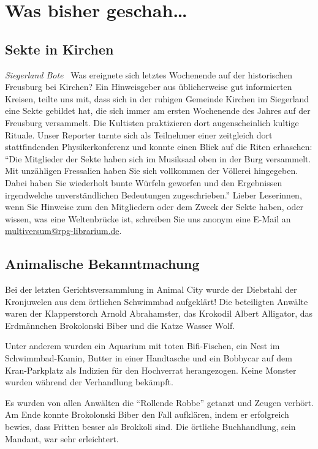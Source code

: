 \documentclass[final]{multiversum}
\begin{document}
\makemultititle
%

\section{Was bisher geschah\ldots}

\subsection{Sekte in Kirchen}
\textit{Siegerland Bote} \textendash\ Was ereignete sich letztes Wochenende auf
der historischen Freusburg bei Kirchen? Ein Hinweisgeber aus üblicherweise gut
informierten Kreisen, teilte uns mit, dass sich in der ruhigen Gemeinde Kirchen
im Siegerland eine Sekte gebildet hat, die sich immer am ersten Wochenende des
Jahres auf der Freusburg versammelt. Die Kultisten praktizieren dort
augenscheinlich kultige Rituale. Unser Reporter tarnte sich als Teilnehmer einer
zeitgleich dort stattfindenden Physikerkonferenz und konnte einen Blick auf die
Riten erhaschen: \enquote{Die Mitglieder der Sekte haben sich im Musiksaal oben
in der Burg versammelt. Mit unzähligen Fressalien haben Sie sich vollkommen der
Völlerei hingegeben. Dabei haben Sie wiederholt bunte Würfeln geworfen und den
Ergebnissen irgendwelche unverständlichen Bedeutungen zugeschrieben.} Lieber
Leserinnen, wenn Sie Hinweise zum den Mitgliedern oder dem Zweck der Sekte
haben, oder wissen, was eine Weltenbrücke ist, schreiben Sie uns anonym eine
E-Mail an \url{multiversum@rpg-librarium.de}.


\subsection{Animalische Bekanntmachung}
Bei der letzten Gerichtsversammlung in Animal City wurde der Diebstahl der
Kronjuwelen aus dem örtlichen Schwimmbad aufgeklärt!  Die beteiligten Anwälte
waren der Klapperstorch Arnold Abrahamster, das Krokodil Albert Alligator, das
Erdmännchen Brokolonski Biber und die Katze Wasser Wolf.

Unter anderem wurden
ein Aquarium mit toten Bifi-Fischen, ein Nest im Schwimmbad-Kamin, Butter in
einer Handtasche und ein Bobbycar auf dem Kran-Parkplatz als Indizien für den
Hochverrat herangezogen.  Keine Monster wurden während der Verhandlung bekämpft.

Es wurden von allen Anwälten die \enquote{Rollende Robbe} getanzt und Zeugen
verhört.  Am Ende konnte Brokolonski Biber den Fall aufklären, indem er
erfolgreich bewies, dass Fritten besser als Brokkoli sind.  Die örtliche
Buchhandlung, sein Mandant, war sehr erleichtert.
\end{document}
